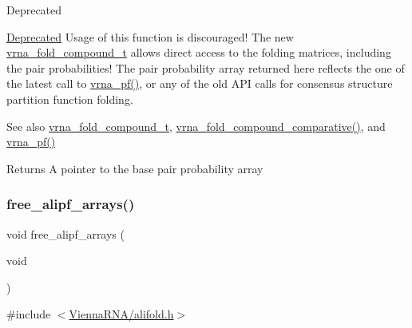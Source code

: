 \begin{DoxyRefDesc}{Deprecated}
\item[\hyperlink{deprecated__deprecated000021}{Deprecated}]Usage of this function is discouraged! The new \hyperlink{group__fold__compound_ga1b0cef17fd40466cef5968eaeeff6166}{vrna\+\_\+fold\+\_\+compound\+\_\+t} allows direct access to the folding matrices, including the pair probabilities! The pair probability array returned here reflects the one of the latest call to \hyperlink{group__part__func__global_ga29e256d688ad221b78d37f427e0e99bc}{vrna\+\_\+pf()}, or any of the old A\+PI calls for consensus structure partition function folding.\end{DoxyRefDesc}


\begin{DoxySeeAlso}{See also}
\hyperlink{group__fold__compound_ga1b0cef17fd40466cef5968eaeeff6166}{vrna\+\_\+fold\+\_\+compound\+\_\+t}, \hyperlink{group__fold__compound_gad6bacc816af274922b13d947f708aa0c}{vrna\+\_\+fold\+\_\+compound\+\_\+comparative()}, and \hyperlink{group__part__func__global_ga29e256d688ad221b78d37f427e0e99bc}{vrna\+\_\+pf()}
\end{DoxySeeAlso}
\begin{DoxyReturn}{Returns}
A pointer to the base pair probability array 
\end{DoxyReturn}
\mbox{\label{group__part__func__global__deprecated_ga0c0498f35686e26b38ee460d3db1a661}} 
\subsubsection{\texorpdfstring{free\+\_\+alipf\+\_\+arrays()}{free\_alipf\_arrays()}}
{\footnotesize\ttfamily void free\+\_\+alipf\+\_\+arrays (\begin{DoxyParamCaption}\item[{void}]{ }\end{DoxyParamCaption})}



{\ttfamily \#include $<$\hyperlink{alifold_8h}{Vienna\+R\+N\+A/alifold.\+h}$>$}



